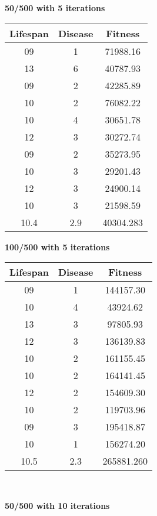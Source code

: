 \documentclass[conference,compsoc]{IEEEtran}
\begin{document}
\begin{table}[!t]
\begin{center}
\begin{minipage}{0.25\textwidth}
\centering
\textbf{50/500 with 5 iterations}\\
	\begin{tabular}{|c|c|c|}
	\hline
	Lifespan & Disease & Fitness\\
	\hline
	09 & 1 & 71988.16\\
	13 & 6 & 40787.93\\
	09 & 2 & 42285.89\\
	10 & 2 & 76082.22\\
	10 & 4 & 30651.78\\
	12 & 3 & 30272.74\\
	09 & 2 & 35273.95\\
	10 & 3 & 29201.43\\
	12 & 3 & 24900.14\\
	10 & 3 & 21598.59\\
	\hline
	10.4 & 2.9 & 40304.283\\
	\hline
	\end{tabular}
\end{minipage}%
\begin{minipage}{0.25\textwidth}
\centering
\textbf{100/500 with 5 iterations}\\
	\begin{tabular}{|c|c|c|}
	\hline
	Lifespan & Disease & Fitness\\
	\hline
	09 & 1 & 144157.30\\
	10 & 4 &  43924.62\\
	13 & 3 &  97805.93\\
	12 & 3 & 136139.83\\
	10 & 2 & 161155.45\\
	10 & 2 & 164141.45\\
	12 & 2 & 154609.30\\
	10 & 2 & 119703.96\\
	09 & 3 & 195418.87\\
	10 & 1 & 156274.20\\
	\hline
	10.5 & 2.3 & 265881.260\\
	\hline
	\end{tabular}
\end{minipage}%
\\[3ex]
\begin{minipage}{0.25\textwidth}
\centering
\textbf{50/500 with 10 iterations}\\
	\begin{tabular}{|c|c|c|}

\end{tabular}
\end{minipage}
\end{center}
\end{table}
\end{document}
